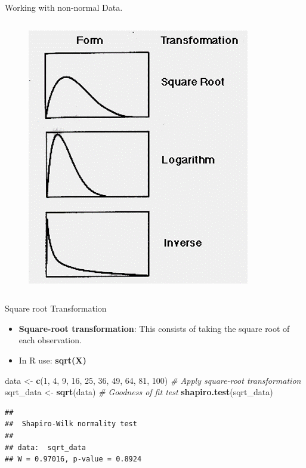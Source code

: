 \documentclass[
  ignorenonframetext,
]{beamer}
\newenvironment{Shaded}{\begin{snugshade}}{\end{snugshade}}
\newcommand{\CommentTok}[1]{\textcolor[rgb]{0.56,0.35,0.01}{\textit{#1}}}
\newcommand{\DecValTok}[1]{\textcolor[rgb]{0.00,0.00,0.81}{#1}}
\newcommand{\FunctionTok}[1]{\textcolor[rgb]{0.13,0.29,0.53}{\textbf{#1}}}
\newcommand{\NormalTok}[1]{#1}
\newcommand{\OtherTok}[1]{\textcolor[rgb]{0.56,0.35,0.01}{#1}}
\begin{document}
\begin{frame}{Working with non-normal Data.}
\begin{columns}[T]
\begin{column}{0.48\textwidth}
\begin{figure}
{\centering \includegraphics[width=0.8\linewidth]{fig/transformation} 

}

\end{figure}
\end{column}
\end{columns}
\end{frame}

\begin{frame}[fragile]{Square root Transformation}
\label{square-root-transformation}
\begin{itemize}
\item
  \textbf{Square-root transformation}: This consists of taking the
  square root of each observation.
\item
  In R use: \textbf{sqrt(X)}
\end{itemize}

\begin{Shaded}
\begin{Highlighting}[]
\NormalTok{data }\OtherTok{\textless{}{-}} \FunctionTok{c}\NormalTok{(}\DecValTok{1}\NormalTok{, }\DecValTok{4}\NormalTok{, }\DecValTok{9}\NormalTok{, }\DecValTok{16}\NormalTok{, }\DecValTok{25}\NormalTok{, }\DecValTok{36}\NormalTok{, }\DecValTok{49}\NormalTok{, }\DecValTok{64}\NormalTok{, }\DecValTok{81}\NormalTok{, }\DecValTok{100}\NormalTok{)}
\CommentTok{\# Apply square{-}root transformation}
\NormalTok{sqrt\_data }\OtherTok{\textless{}{-}} \FunctionTok{sqrt}\NormalTok{(data)}
\CommentTok{\# Goodness of fit test}
\FunctionTok{shapiro.test}\NormalTok{(sqrt\_data)}
\end{Highlighting}
\end{Shaded}

\begin{verbatim}
## 
##  Shapiro-Wilk normality test
## 
## data:  sqrt_data
## W = 0.97016, p-value = 0.8924
\end{verbatim}
\end{frame}
\end{document}
